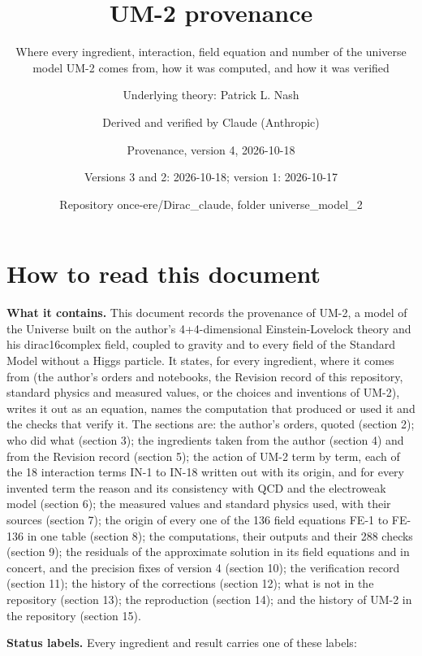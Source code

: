 \documentclass[
  10pt,
]{article}
\title{UM-2 provenance}
\subtitle{Where every ingredient, interaction, field equation and number
of the universe model UM-2 comes from, how it was computed, and how it
was verified}
\author{Underlying theory: Patrick L. Nash \and Derived and verified by
Claude (Anthropic) \and Provenance, version 4, 2026-10-18 \and Versions
3 and 2: 2026-10-18; version 1: 2026-10-17 \and Repository
once-ere/Dirac\_claude, folder universe\_model\_2}
\date{}
\begin{document}
\maketitle

{
\hypersetup{linkcolor=}
\setcounter{tocdepth}{3}
\tableofcontents
}
\hypertarget{how-to-read-this-document}{%
\section{How to read this document}\label{how-to-read-this-document}}

\textbf{What it contains.} This document records the provenance of UM-2,
a model of the Universe built on the author's 4+4-dimensional
Einstein-Lovelock theory and his dirac16complex field, coupled to
gravity and to every field of the Standard Model without a Higgs
particle. It states, for every ingredient, where it comes from (the
author's orders and notebooks, the Revision record of this repository,
standard physics and measured values, or the choices and inventions of
UM-2), writes it out as an equation, names the computation that produced
or used it and the checks that verify it. The sections are: the author's
orders, quoted (section 2); who did what (section 3); the ingredients
taken from the author (section 4) and from the Revision record (section
5); the action of UM-2 term by term, each of the 18 interaction terms
IN-1 to IN-18 written out with its origin, and for every invented term
the reason and its consistency with QCD and the electroweak model
(section 6); the measured values and standard physics used, with their
sources (section 7); the origin of every one of the 136 field equations
FE-1 to FE-136 in one table (section 8); the computations, their outputs
and their 288 checks (section 9); the residuals of the approximate
solution in its field equations and in concert, and the precision fixes
of version 4 (section 10); the verification record (section 11); the
history of the corrections (section 12); what is not in the repository
(section 13); the reproduction (section 14); and the history of UM-2 in
the repository (section 15).

\textbf{Status labels.} Every ingredient and result carries one of these
labels:
\end{document}
